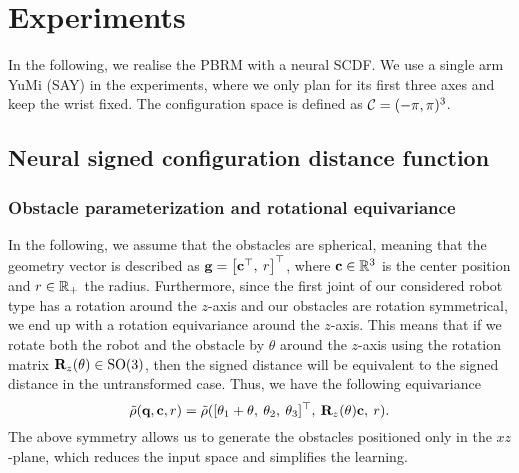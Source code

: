 \documentclass[../main.tex]{subfiles}
\begin{document}
\section{Experiments}
\label{sec:exp}
In the following, we realise the PBRM with a neural SCDF. We use a single arm YuMi (SAY) \citep{say} in the experiments, where we only plan for its first three axes and keep the wrist fixed. The configuration space is defined as $\mathcal{C} = (-\pi, \pi)^3$.
\subsection{Neural signed configuration distance function}
\subsubsection{Obstacle parameterization and rotational equivariance}
In the following, we assume that the obstacles are spherical, meaning that the geometry vector is described as $\textbf{g}=\begin{bmatrix} \textbf{c}^\top, \: r \end{bmatrix}^\top$, where $\textbf{c} \in \mathbb{R}^3$ is the center position and $r \in \mathbb{R}_{+}$ the radius. Furthermore, since the first joint of our considered robot type has a rotation around the $z$-axis and our obstacles are rotation symmetrical, we end up with a rotation equivariance around the $z$-axis. This means that if we rotate both the robot and the obstacle by $\theta$ around the $z$-axis using the rotation matrix $\textbf{R}_z(\theta) \in \text{SO}(3)$, then the signed distance will be equivalent to the signed distance in the untransformed case. Thus, we have the following equivariance
\begin{equation}
\tilde{\rho}(\textbf{q}, \textbf{c}, r) = \tilde{\rho}([\theta_1 + \theta, \: \theta_2, \:  \theta_3 ]^\top, \: \textbf{R}_z(\theta)\textbf{c}, \: r).
\end{equation}
The above symmetry allows us to generate the obstacles positioned only in the $xz$-plane, which reduces the input space and simplifies the learning.
\end{document}
